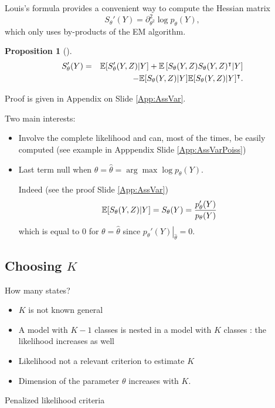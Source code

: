 \documentclass[compress,10pt]{beamer}
\newtheorem{proposition}{Proposition}
\begin{document}
\begin{frame}[allowframebreaks]{Louis's formula}
 \label{Prop:Louis}
\cite{Louis82} provides a convenient way to compute the Hessian matrix
$$
S_\theta'(Y) = \partial^2_{\theta^2} \log p_\theta(Y),
$$
which only uses by-products of the EM algorithm. 

\begin{proposition}[\cite{Louis82}]
\begin{eqnarray*}
   S_\theta'(Y) &=& \mathbb{E}[S_\theta'(Y ,Z) | Y] +  \mathbb{E}\left[S_\theta(Y, Z) S_\theta(Y, Z)^\intercal | Y \right]\\
   && - \mathbb{E}[S_ \theta(Y, Z) | Y] \mathbb{E}[S_ \theta(Y, Z) | Y]^\intercal.
\end{eqnarray*}
\end{proposition}

{Proof is given in Appendix on Slide \ref{App:AssVar}.}
\vspace{3em}

\textcolor{dgreen}{Two main interests}:
\begin{itemize}
\item Involve the complete likelihood and can, most of
  the times, be easily computed (see example in Apppendix Slide  \ref{App:AssVarPoiss})  
\item Last term null  when $\theta = \widehat{\theta} =
  \arg\max \log p_\theta(Y)$. 
  
  Indeed (see the proof Slide \ref{App:AssVar})
  $$\mathbb{E}[S_ \theta(Y, Z) | Y] = S_\theta(Y) =\frac{p'_\theta(Y)}{p_\theta(Y)}$$  which is equal to $0$ for  $\theta = \widehat{\theta}$
  since $\left.p_\theta'(Y)\right|_{\widehat{\theta}} = 0$.
\end{itemize}
\end{frame}



\subsection{Choosing $K$}
\begin{frame}{How many states?}
\begin{itemize}
 \item $K$ is not known general
 \item A model with $K-1$ classes is nested in a model with $K$ classes : the likelihood increases as well
 \item Likelihood not a relevant criterion to estimate $K$
\item Dimension of the parameter $\theta$ increases with $K$.
\end{itemize}
  
  
  \begin{center}
   \textcolor{dgreen}{Penalized likelihood criteria}
  \end{center}

  
\end{frame}
\end{document}
